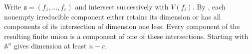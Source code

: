 Write $\mathfrak a=(f_1,\ldots,f_r)$ and intersect successively with $V(f_i)$. By , each nonempty irreducible component either retains its dimension or has all components of its intersection of dimension one less. Every component of the resulting finite union is a component of one of these intersections. Starting with $\mathbb A^n$ gives dimension at least $n-r$.
